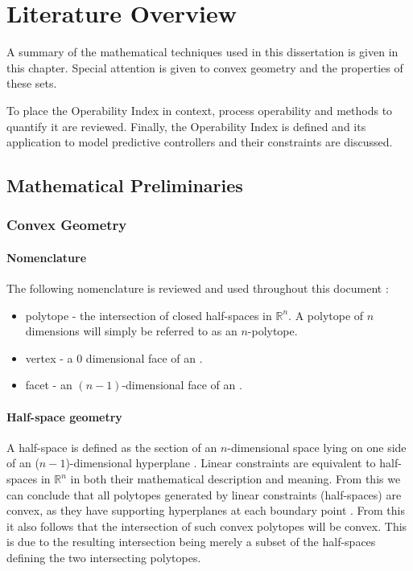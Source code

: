 \chapter{Literature Overview}\label{chap:lit}
\begin{overview}
  A summary of the mathematical techniques used in this dissertation is given in this chapter.
  Special attention is given to convex geometry and the properties of these sets.

  To place the Operability Index in context, process operability and methods to quantify it are reviewed.
  Finally, the Operability Index is defined and its application to model predictive controllers and their constraints are discussed.  
\end{overview}

\section{Mathematical Preliminaries}
\subsection{Convex Geometry}
\subsubsection{Nomenclature}
The following nomenclature is reviewed and used throughout this document \citep[487]{bayerlee}:
\begin{itemize}
\item polytope - the intersection of closed half-spaces in $\mathbb{R}^n$.
A polytope of $n$ dimensions will simply be referred to as an $n$-polytope.
\item vertex - a 0 dimensional face of an \npoly.
\item facet - an $(n-1)$-dimensional face of an \npoly.
\end{itemize}

\subsubsection{Half-space geometry}\label{sec:hgeometry}
A half-space is defined as the section of an $n$-dimensional space lying on one side of an ($n-1$)-dimensional hyperplane \citep[1282]{crcmaths}.
Linear constraints are equivalent to half-spaces in $\mathbb{R}^n$ in both their mathematical description and meaning.
From this we can conclude that all polytopes generated by linear constraints (half-spaces) are convex, as they have supporting hyperplanes at each boundary point \citep[21]{manilev}.
From this it also follows that the intersection of such convex polytopes will be convex.
This is due to the resulting intersection being merely a subset of the half-spaces defining the two intersecting polytopes.

